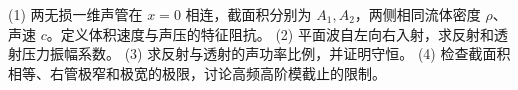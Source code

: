 (1) 两无损一维声管在 \(x=0\) 相连，截面积分别为 \(A_1,A_2\)，两侧相同流体密度 \(\rho\)、声速 \(c\)。定义体积速度与声压的特征阻抗。
(2) 平面波自左向右入射，求反射和透射压力振幅系数。
(3) 求反射与透射的声功率比例，并证明守恒。
(4) 检查截面积相等、右管极窄和极宽的极限，讨论高频高阶模截止的限制。
